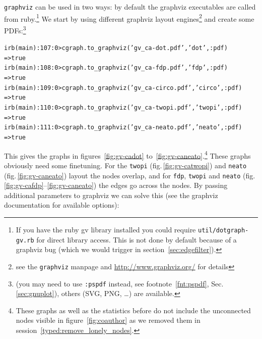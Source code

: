 \documentclass[a4paper]{scrartcl}
\newcounter{tcounter}
\newcommand{\tcount}{\makebox[0pt][r]{\tiny\thetcounter~}}
\newenvironment{typed}{\refstepcounter{tcounter}\bgroup\setlength{\topsep}{0pt}\renewcommand{\FrameCommand}[1]{\fcolorbox{black!30}{bgcolor}{##1}\tcount}\MakeFramed{\FrameRestore}\begin{alltt}\small}{\end{alltt}\endMakeFramed\egroup\par\aftergroup\noindent\aftergroup\ignorespaces}
\newcommand{\file}[1]{\texttt{\color{file}#1}}
\newcommand{\code}[1]{\texttt{\color{code}#1}}
\newcommand{\cmd}[1]{\texttt{\color{cmd}#1}}
\newcommand{\p}{\textcolor{prompt}}
\renewcommand{\c}{\textcolor{cmd}}
\begin{document}
\file{graphviz} can be used in two ways: by default the graphviz
executables are called from ruby.\footnote{If you have the ruby gv library
installed you could require \file{util/dotgraph-gv.rb} for direct
library access. This is not done by default because of a graphviz bug
(which we would trigger in section~\ref{sec:edgefilter}).}
We start by using
different graphviz layout engines\footnote{see the \file{graphviz} manpage and
\url{http://www.graphviz.org/} for details} and create some PDFs:\footnote{(you may need to use \cmd{:pspdf} instead, see
  footnote~\ref{fnt:pspdf}, Sec.\,\ref{sec:gnuplot}), others
  (SVG, PNG, \dots) are available.}
\begin{typed}
\p{irb(main):107:0>} \c{cgraph.to_graphviz('gv_ca-dot.pdf','dot', :pdf)}
=> true
\p{irb(main):108:0>} \c{cgraph.to_graphviz('gv_ca-fdp.pdf','fdp', :pdf)}
=> true
\p{irb(main):109:0>} \c{cgraph.to_graphviz('gv_ca-circo.pdf','circo', :pdf)}
=> true
\p{irb(main):110:0>} \c{cgraph.to_graphviz('gv_ca-twopi.pdf','twopi', :pdf)}
=> true
\p{irb(main):111:0>} \c{cgraph.to_graphviz('gv_ca-neato.pdf','neato', :pdf)}
=> true
\end{typed}
This gives the graphs in figures~\ref{fig:gv-cadot}
to~\ref{fig:gv-caneato}.\footnote{These graphs as well as the
  statistics before do not include the unconnected nodes visible in
  figure~\ref{fig:coauthor} as we removed them in session~\ref{typed:remove_lonely_nodes}.}  These graphs obviously need some
finetuning. For the \code{twopi} (fig.\,\ref{fig:gv-catwopi}) and
\code{neato} (fig.\,\ref{fig:gv-caneato}) layout the nodes overlap,
and for \code{fdp}, \code{twopi} and \code{neato}
(fig.\,\ref{fig:gv-cafdp}--\ref{fig:gv-caneato}) the edges go across
the nodes. By passing additional parameters to graphviz we can solve
this (see the graphviz documentation for available options):
\end{document}
